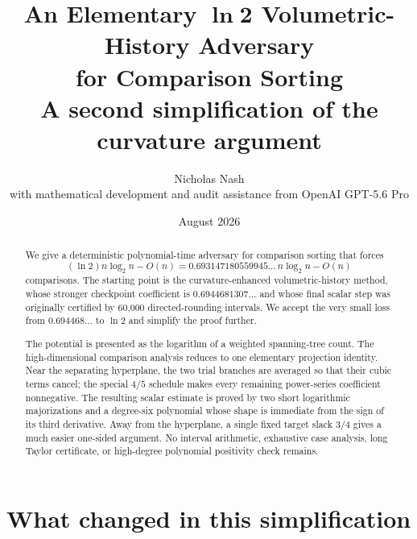 \documentclass[11pt]{article}
\title{\textbf{An Elementary $\boldsymbol{\ln 2}$ Volumetric-History Adversary\\for Comparison Sorting}\\[0.45em]
\large A second simplification of the curvature argument}
\author{Nicholas Nash\\with mathematical development and audit assistance from OpenAI GPT-5.6 Pro}
\date{August 2026}
\theoremstyle{definition}
\newcommand{\1}{\mathbf{1}}
\begin{document}
\maketitle

\begin{abstract}
We give a deterministic polynomial-time adversary for comparison sorting that forces
\[
 (\ln 2)n\log_2 n-O(n)
 =0.693147180559945\ldots\,n\log_2 n-O(n)
\]
comparisons.  The starting point is the curvature-enhanced volumetric-history method, whose stronger checkpoint coefficient is $0.6944681307\ldots$ and whose final scalar step was originally certified by 60,000 directed-rounding intervals.  We accept the very small loss from $0.694468\ldots$ to $\ln 2$ and simplify the proof further.

The potential is presented as the logarithm of a weighted spanning-tree count.  The high-dimensional comparison analysis reduces to one elementary projection identity.  Near the separating hyperplane, the two trial branches are averaged so that their cubic terms cancel; the special $4/5$ schedule makes every remaining power-series coefficient nonnegative.  The resulting scalar estimate is proved by two short logarithmic majorizations and a degree-six polynomial whose shape is immediate from the sign of its third derivative.  Away from the hyperplane, a single fixed target slack $3/4$ gives a much easier one-sided argument.  No interval arithmetic, exhaustive case analysis, long Taylor certificate, or high-degree polynomial positivity check remains.
\end{abstract}

\vspace{0.5em}
\noindent
{}

\tableofcontents

\section{What changed in this simplification}
\end{document}
